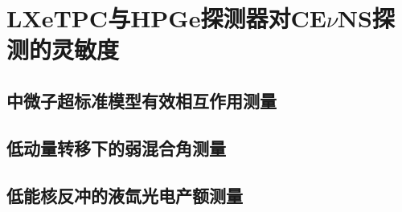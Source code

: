 
\chapter{LXeTPC与HPGe探测器对CE$\nu$NS探测的灵敏度}
\label{sec:sensitivity}

\section{中微子超标准模型有效相互作用测量}

\section{低动量转移下的弱混合角测量}

\section{低能核反冲的液氙光电产额测量}
